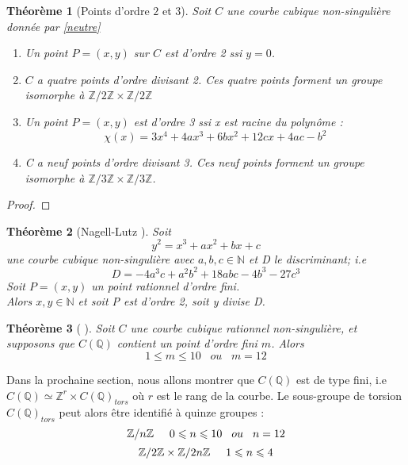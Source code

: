 \documentclass[a4paper]{article}
\newtheorem{theorem}{Théorème}
\begin{document}
\begin{theorem}[Points d'ordre $2$ et $3$]
Soit $C$ une courbe cubique non-singulière donnée par \eqref{neutre}
\begin{enumerate}
\item Un point $P=(x,y)$ sur $C$ est d'ordre 2 ssi $y=0$.
\item $C$ a quatre points d'ordre divisant 2.
Ces quatre points forment un groupe isomorphe à $\mathbb{Z}/2\mathbb{Z} \times \mathbb{Z}/2\mathbb{Z}$
\item Un point $P=(x,y)$ est d'ordre 3 ssi x est racine du polynôme :
\begin{equation*}
\chi(x)= 3x^4+4ax^3+6bx^2+12cx+4ac-b^2
\end{equation*}
\item C a neuf points d'ordre divisant 3. Ces neuf points  forment un groupe isomorphe à 
$\mathbb{Z}/3\mathbb{Z} \times \mathbb{Z}/3\mathbb{Z}$.
\end{enumerate}
\end{theorem}
\begin{proof}

\end{proof}


\begin{theorem}[Nagell-Lutz \cite{ref3}
\cite{ref4}]
Soit 
\begin{equation*}
y^2=x^3+ax^2+bx+c
\end{equation*}
une courbe cubique non-singulière avec $a,b,c \in \mathbb{N}$ et D le discriminant; i.e
\begin{equation*}
D=-4a^3c+a^2b^2+18abc-4b^3-27c^3
\end{equation*}
Soit $P=(x,y)$ un point rationnel d'ordre fini. \\
Alors $x,y \in \mathbb{N}$ et soit P est d'ordre 2, soit y divise D.
\end{theorem}

\begin{theorem}[\cite{ref6} \cite{ref7}]
Soit $C$ une courbe cubique rationnel non-singulière, et supposons que $C(\mathbb{Q})$ contient un point d'ordre fini $m$. Alors
\begin{equation*}
1 \leqslant m \leqslant 10 \; \; \; ou \; \; \; m=12
\end{equation*}
\end{theorem}
Dans la prochaine section, nous allons montrer que $C(\mathbb{Q})$ est de type fini, i.e $C(\mathbb{Q}) \simeq \mathbb{Z}^r \times C(\mathbb{Q})_{tors}$ où $r$ est le rang de la courbe. Le sous-groupe de torsion $C(\mathbb{Q})_{tors}$ peut alors être identifié à quinze groupes :
\begin{equation*}
\mathbb{Z}/n\mathbb{Z} \hspace{0.5cm} 0 \leqslant n \leqslant 10 \hspace{0.3cm} ou\hspace{0.3cm} n=12
\end{equation*}
\begin{equation*}
\mathbb{Z}/2\mathbb{Z} \times \mathbb{Z}/2n\mathbb{Z} \hspace{0.5cm}  1\leqslant n \leqslant 4
\end{equation*}
\end{document}
